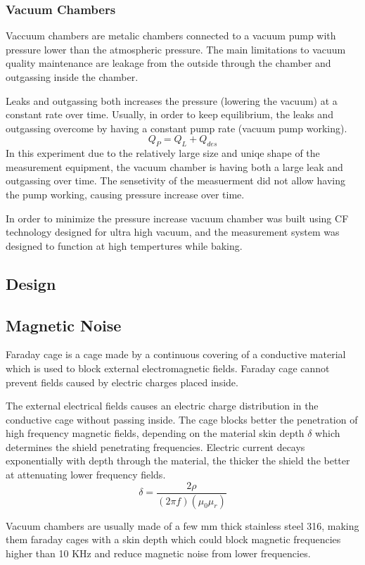 \documentclass[\main/master.tex]{subfiles}
\begin{document}
\subsubsection{Vacuum Chambers}
Vaccuum chambers are metalic chambers connected to a vacuum pump with pressure lower than the atmospheric pressure. The main limitations to vacuum quality maintenance are leakage from the outside through the chamber and outgassing inside the chamber.
\par
Leaks and outgassing both increases the pressure (lowering the vacuum) at a constant rate over time. Usually, in order to keep equilibrium, the leaks and outgassing overcome by having a constant pump rate (vacuum pump working).   
\begin{equation}
Q_P = Q_L + Q_{des}  \label{eqn:vacuum_equilibrium}
\end{equation}
In this experiment due to the relatively large size and uniqe shape of the measurement equipment, the vacuum chamber is having both a large leak and outgassing over time. The sensetivity of the measuerment did not allow having the pump working, causing pressure increase over time.
\par 
In order to minimize the pressure increase vacuum chamber was built using CF technology designed for ultra high vacuum, and the measurement system was designed to function at high tempertures while baking.
\subsection{Design}



\subsection{Magnetic Noise}

Faraday cage is a cage made by a continuous covering of a conductive material which is used to block external electromagnetic fields. Faraday cage cannot prevent fields caused by electric charges placed inside.
\par
The external electrical fields causes an electric charge distribution in the conductive cage without passing inside. The cage blocks better the penetration of high frequency magnetic fields, depending on the material skin depth $\delta$ which determines the shield penetrating frequencies. Electric current decays exponentially with depth through the material, the thicker the shield the better at attenuating lower frequency fields.
\begin{equation}
\delta = \frac{2\rho}{(2\pi f)(\mu_0\mu_r)}     \label{eqn:mean-free-pass}
\end{equation}
\iffalse
Where $\rho$ is the material electric resistivity, and $\mu_r$ is the relative magnetic permeability.
\fi
Vacuum chambers are usually made of a few mm thick stainless steel 316, making them faraday cages with a skin depth which could block magnetic frequencies higher than 10 KHz and reduce magnetic noise from lower frequencies.
\end{document}
